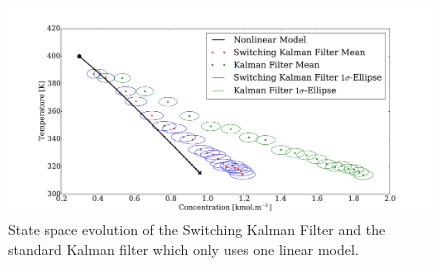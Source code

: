 \documentclass[../masters.tex]{subfiles}
\begin{document}
\begin{figure}[H] 
\centering
\includegraphics[scale=0.3]{skf_s7_p_m1.pdf}
\caption{State space evolution of the Switching Kalman Filter and the standard Kalman filter which only uses one linear model.}
\label{fig_7mod_p_m1}
\end{figure}
\end{document}
